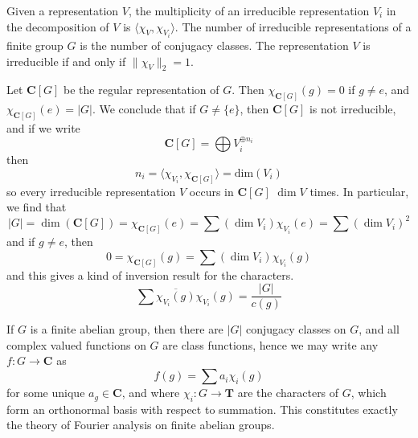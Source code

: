 \begin{corollary}
    Given a representation $V$, the multiplicity of an irreducible representation $V_i$ in the decomposition of $V$ is $\langle \chi_V, \chi_{V_i} \rangle$. The number of irreducible representations of a finite group $G$ is the number of conjugacy classes. The representation $V$ is irreducible if and only if $\| \chi_V \|_2 = 1$.
\end{corollary}

\begin{example}
    Let $\mathbf{C}[G]$ be the regular representation of $G$. Then $\chi_{\mathbf{C}[G]}(g) = 0$ if $g \neq e$, and $\chi_{\mathbf{C}[G]}(e) = |G|$. We conclude that if $G \neq \{ e \}$, then $\mathbf{C}[G]$ is not irreducible, and if we write
    \[ \mathbf{C}[G] = \bigoplus V_i^{\oplus n_i} \]
    then
    \[ n_i = \langle \chi_{V_i}, \chi_{\mathbf{C}[G]} \rangle = \text{dim}(V_i) \]
    so every irreducible representation $V$ occurs in $\mathbf{C}[G]$ $\dim V$ times. In particular, we find that
    \[ |G| = \dim(\mathbf{C}[G]) = \chi_{\mathbf{C}[G]}(e) = \sum (\dim V_i) \chi_{V_i}(e) = \sum (\dim V_i)^2 \]
    and if $g \neq e$, then
    \[ 0 = \chi_{\mathbf{C}[G]}(g) = \sum (\dim V_i) \chi_{V_i}(g) \]
    and this gives a kind of inversion result for the characters.
    \[ \sum \overline{\chi_{V_i}(g)} \chi_{V_i}(g) = \frac{|G|}{c(g)} \]
\end{example}

\begin{example}
    If $G$ is a finite abelian group, then there are $|G|$ conjugacy classes on $G$, and all complex valued functions on $G$ are class functions, hence we may write any $f: G \to \mathbf{C}$ as
    \[ f(g) = \sum a_i \chi_i(g) \]
    for some unique $a_g \in \mathbf{C}$, and where $\chi_i: G \to \mathbf{T}$ are the characters of $G$, which form an orthonormal basis with respect to summation. This constitutes exactly the theory of Fourier analysis on finite abelian groups.
\end{example}


